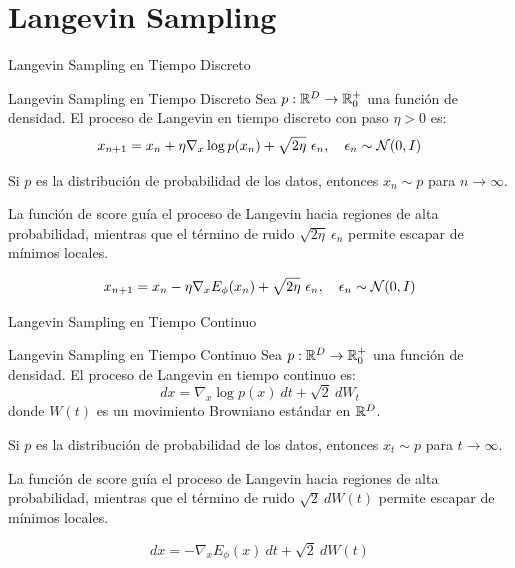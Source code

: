 \documentclass{beamer}
\begin{document}
\section{Langevin Sampling}

\begin{frame}{Langevin Sampling en Tiempo Discreto}
    \begin{definitionblock}{Langevin Sampling en Tiempo Discreto}
        Sea $p:\mathbb{R}^D\to \mathbb{R}^+_0$ una función de densidad. El proceso de Langevin en tiempo discreto con paso $\eta>0$ es:
        \begin{equation*}
            x_{n+1} = x_n + \eta \nabla_x \log p(x_n) + \sqrt{2\eta}\ \epsilon_n, \quad \epsilon_n\sim \mathcal{N}(0, I)
        \end{equation*}
    \end{definitionblock}
    
    Si $p$ es la distribución de probabilidad de los datos, entonces $x_n\sim p$ para $n\to \infty$.\pause

    La función de score guía el proceso de Langevin hacia regiones de alta probabilidad, mientras que el término de ruido $\sqrt{2\eta}\ \epsilon_n$ permite escapar de mínimos locales.\pause

    \begin{equation*}
        x_{n+1} = x_n - \eta \nabla_x E_\phi(x_n) + \sqrt{2\eta}\ \epsilon_n, \quad \epsilon_n\sim \mathcal{N}(0, I)
    \end{equation*}
    
\end{frame}

\begin{frame}{Langevin Sampling en Tiempo Continuo}
    \begin{definitionblock}{Langevin Sampling en Tiempo Continuo}
        Sea $p:\mathbb{R}^D\to \mathbb{R}^+_0$ una función de densidad. El proceso de Langevin en tiempo continuo es:
        \begin{equation*}
            dx = \nabla_x \log p(x)\ dt + \sqrt{2}\ dW_t
        \end{equation*}
        donde $W(t)$ es un movimiento Browniano estándar en $\mathbb{R}^D$.
    \end{definitionblock}

    Si $p$ es la distribución de probabilidad de los datos, entonces $x_t\sim p$ para $t\to \infty$.\pause

    La función de score guía el proceso de Langevin hacia regiones de alta probabilidad, mientras que el término de ruido $\sqrt{2}\ dW(t)$ permite escapar de mínimos locales.\pause

    \begin{equation*}
        dx = -\nabla_x E_\phi(x)\ dt + \sqrt{2}\ dW(t)
    \end{equation*}
    
\end{frame}
\end{document}
